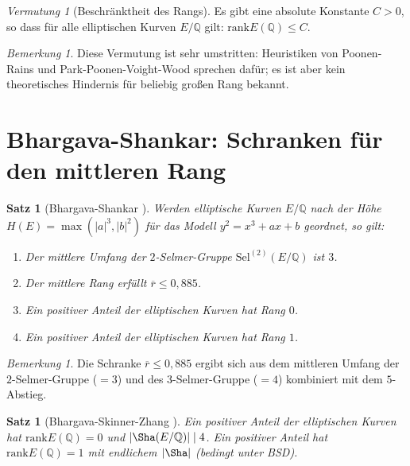 \documentclass[12pt,a4paper]{amsart}
\newtheorem{satz}[theorem]{Satz}
\theoremstyle{definition}
\theoremstyle{remark}
\newtheorem{bemerkung}[theorem]{Bemerkung}
\newtheorem{vermutung}[theorem]{Vermutung}
\newcommand{\Q}{\mathbb{Q}}
\newcommand{\Sel}{\mathrm{Sel}}
\newcommand{\rank}{\mathrm{rank}}
\begin{document}
\begin{vermutung}[Beschränktheit des Rangs]\label{verm:beschraenkt}
  Es gibt eine absolute Konstante $C > 0$, so dass für alle elliptischen Kurven $E/\Q$
  gilt: $\rank E(\Q) \leq C$.
\end{vermutung}

\begin{bemerkung}
  Diese Vermutung ist sehr umstritten: Heuristiken von Poonen-Rains \cite{PR2012} und
  Park-Poonen-Voight-Wood \cite{PPVW2019} sprechen dafür; es ist aber kein theoretisches
  Hindernis für beliebig großen Rang bekannt.
\end{bemerkung}

\section{Bhargava-Shankar: Schranken für den mittleren Rang}\label{sec:bhargava}

\begin{satz}[Bhargava-Shankar \cite{BS2015}]\label{satz:bs}
  Werden elliptische Kurven $E/\Q$ nach der Höhe $H(E) = \max(|a|^3, |b|^2)$
  für das Modell $y^2 = x^3 + ax + b$ geordnet, so gilt:
  \begin{enumerate}[label=(\roman*)]
    \item Der mittlere Umfang der $2$-Selmer-Gruppe $\Sel^{(2)}(E/\Q)$ ist $3$.
    \item Der mittlere Rang erfüllt $\overline{r} \leq 0{,}885$.
    \item Ein positiver Anteil der elliptischen Kurven hat Rang $0$.
    \item Ein positiver Anteil der elliptischen Kurven hat Rang $1$.
  \end{enumerate}
\end{satz}

\begin{bemerkung}
  Die Schranke $\overline{r} \leq 0{,}885$ ergibt sich aus dem mittleren Umfang der
  $2$-Selmer-Gruppe ($= 3$) und des $3$-Selmer-Gruppe ($= 4$) kombiniert mit dem
  $5$-Abstieg.
\end{bemerkung}

\begin{satz}[Bhargava-Skinner-Zhang \cite{BSZ2014}]
  Ein positiver Anteil der elliptischen Kurven hat $\rank E(\Q) = 0$ und
  $|\Sha(E/\Q)| \mid 4$.
  Ein positiver Anteil hat $\rank E(\Q) = 1$ mit endlichem $|\Sha|$
  (bedingt unter BSD).
\end{satz}
\end{document}

